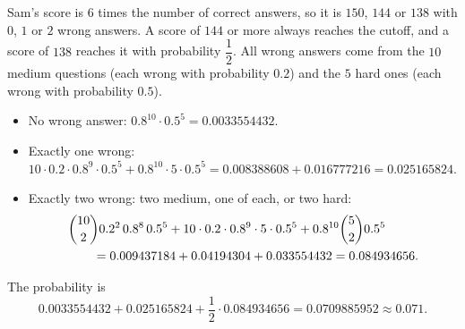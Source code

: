 Sam's score is $6$ times the number of correct answers, so it is $150$, $144$ or $138$ with $0$, $1$ or $2$ wrong answers. A score of $144$ or more always reaches the cutoff, and a score of $138$ reaches it with probability $\dfrac12$. All wrong answers come from the $10$ medium questions (each wrong with probability $0.2$) and the $5$ hard ones (each wrong with probability $0.5$).
\begin{itemize}
\item No wrong answer: $0.8^{10}\cdot0.5^5=0.0033554432$.
\item Exactly one wrong: $10\cdot0.2\cdot0.8^{9}\cdot0.5^5+0.8^{10}\cdot5\cdot0.5^5=0.008388608+0.016777216=0.025165824$.
\item Exactly two wrong: two medium, one of each, or two hard:
\begin{align*}
&\dbinom{10}{2}0.2^2\,0.8^8\,0.5^5+10\cdot0.2\cdot0.8^9\cdot5\cdot0.5^5+0.8^{10}\dbinom52 0.5^5\\
&\qquad=0.009437184+0.04194304+0.033554432=0.084934656.
\end{align*}
\end{itemize}
The probability is
\[0.0033554432+0.025165824+\dfrac12\cdot0.084934656=0.0709885952\approx\boxed{0.071}.\]
